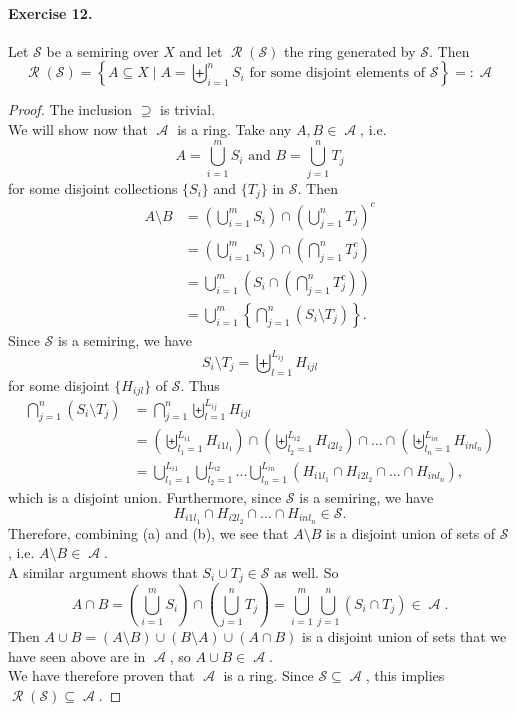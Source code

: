 \documentclass[12pt,a4paper]{report}
\theoremstyle{definition}
\theoremstyle{num.custom-title}
\DeclareMathOperator{\A}{\mathcal{A}}
\DeclareMathOperator{\RR}{\mathcal{R}}
\DeclareMathOperator{\sm}{\setminus}
\DeclareMathOperator{\sse}{\subseteq}
\renewcommand{\S}{\mathcal{S}}
\renewcommand{\1}{\mathbbm{1}}
\begin{document}
\paragraph{Exercise 12.} Let $\S$ be a semiring over $X$ and let $\RR(\S)$ the ring generated by $\S$. Then
\[
\RR(\S)=\left\{ A \sse X \mid A=\biguplus_{i=1}^n S_i \text{ for some disjoint elements of } \S \right\} =:\A
\]
\begin{proof}
The inclusion $\supseteq$ is trivial.\\
We will show now that $\A$ is a ring. Take any $A,B \in \A$, i.e.
\[
A=\bigcup_{i=1}^m S_i \text{ and } B=\bigcup_{j=1}^n T_j
\]
for some disjoint collections $\{S_i\}$ and $\{T_j\}$ in $\S$. Then
\begin{align*}
A \sm B
&= \left( \bigcup_{i=1}^m S_i \right) \cap \left( \bigcup_{j=1}^n T_j \right)^c\\
&= \left( \bigcup_{i=1}^m S_i \right) \cap \left( \bigcap_{j=1}^n T_j^c \right)\\
&= \bigcup_{i=1}^m \left(  S_i \cap \left( \bigcap_{j=1}^n T_j^c \right)\right)\\
&= \bigcup_{i=1}^m \left\{ \bigcap_{j=1}^n  (S_i \sm T_j) \right\}. \tag{a}
\end{align*}
Since $\S$ is a semiring, we have 
\[
S_i \sm T_j = \biguplus_{l=1}^{L_{ij}} H_{ijl}
\]
for some disjoint $\{H_{ijl}\}$ of $\S$. Thus
\begin{align*}
\bigcap_{j=1}^n  (S_i \sm T_j)
&=\bigcap_{j=1}^n \biguplus_{l=1}^{L_{ij}} H_{ijl}\\
&= \left( \biguplus_{l_1=1}^{L_{i1}} H_{i1l_1} \right) \cap \left( \biguplus_{l_2=1}^{L_{i2}} H_{i2l_2} \right) \cap ... \cap \left( \biguplus_{l_n=1}^{L_{in}} H_{inl_n} \right)\\
&= \bigcup_{l_1=1}^{L_{i1}} \bigcup_{l_2=1}^{L_{i2}} ...  \bigcup_{l_n=1}^{L_{in}} (H_{i1l_1} \cap H_{i2l_2} \cap ... \cap  H_{inl_n}), \tag{b}
\end{align*}
which is a disjoint union. Furthermore, since $\S$ is a semiring, we have
\[
H_{i1l_1} \cap H_{i2l_2} \cap ... \cap  H_{inl_n} \in \S.
\]
Therefore, combining (a) and (b), we see that $A \sm B$ is a disjoint union of sets of $\S$, i.e. $A \sm B \in \A$.\\
A similar argument shows that $S_i \cup T_j \in \S$ as well. So 
\[
A \cap B = \left( \bigcup_{i=1}^m S_i \right) \cap \left( \bigcup_{j=1}^n T_j \right) = \bigcup_{i=1}^m \bigcup_{j=1}^n (S_i \cap T_j) \in \A.
\]
Then $A \cup B = (A \sm B) \cup (B \sm A) \cup (A \cap B)$ is a disjoint union of sets that we have seen above are in $\A$, so $A \cup B \in \A$.\\
We have therefore proven that $\A$ is a ring. Since $\S \sse \A$, this implies $\RR(\S) \sse \A$.
\end{proof}
\end{document}
